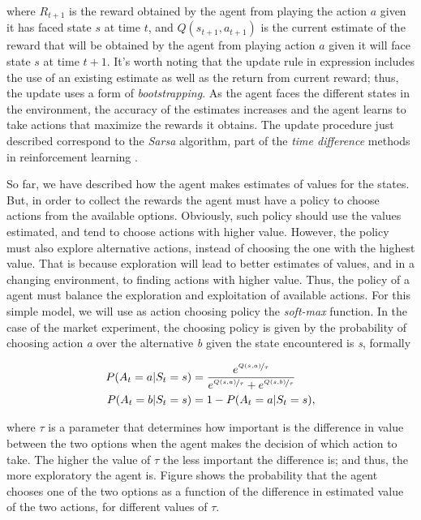 \documentclass{article}
\begin{document}
where $R_{t+1}$ is the reward obtained by the agent from playing the action $a$ given it has faced state $s$ at time $t$, and $Q(s_{t+1},a_{t+1})$ is the current estimate of the reward that will be obtained by the agent from playing action $a$ given it will face state $s$ at time $t+1$. It's worth noting that the update rule in expression  includes the use of an existing estimate as well as the return from current reward; thus, the update uses a form of \textit{bootstrapping}. As the agent faces the different states in the environment, the accuracy of the estimates increases and the agent learns to take actions that maximize the rewards it obtains. The update procedure just described correspond to the \textit{Sarsa} algorithm, part of the \textit{time difference} methods in reinforcement learning \cite{sutton_reinforcement_1998}.

So far, we have described how the agent makes estimates of values for the states. But, in order to collect the rewards the agent must have a policy to choose actions from the available options. Obviously, such policy should use the values estimated, and tend to choose actions with higher value. However, the policy must also explore alternative actions, instead of choosing the one with the highest value. That is because exploration will lead to better estimates of values, and in a changing environment, to finding actions with higher value. Thus, the policy of a agent must balance the exploration and exploitation of available actions. For this simple model, we will use as action choosing policy the \textit{soft-max} function. In the case of the market experiment, the choosing policy is given by the probability of choosing action \textit{a} over the alternative \textit{b} given the state encountered is \textit{s}, formally 

\begin{align}
	P(A_t=a|S_t=s)&=\frac{e^{\nicefrac{Q(s,a)}{\tau}}}{e^{\nicefrac{Q(s,a)}{\tau}}+e^{\nicefrac{Q(s,b)}{\tau}}} \\
	P(A_t=b|S_t=s)&=1-P(A_t=a|S_t=s),
\end{align}

where $\tau$ is a parameter that determines how important is the difference in value between the two options when the agent makes the decision of which action to take. The higher the value of $\tau$ the less important the difference is; and thus, the more exploratory the agent is. Figure  shows the probability that the agent chooses one of the two options as a function of the difference in estimated value of the two actions, for different values of $\tau$.
\end{document}
